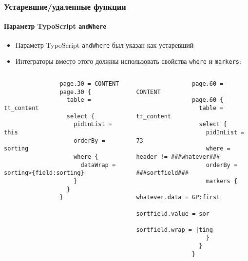 \begin{frame}[fragile]
	\frametitle{Устаревшие/удаленные функции}
	\framesubtitle{Параметр TypoScript \texttt{andWhere}}

	\lstset{basicstyle=\tiny\ttfamily}

	\begin{itemize}
		\item Параметр TypoScript \texttt{andWhere} был указан как устаревший
		\item Интеграторы вместо этого должны использовать свойства \texttt{where} и \texttt{markers}:
	\end{itemize}

	\begin{columns}[T]
		\begin{column}{.6\textwidth}

			\lstset{xleftmargin=1cm}

			\begin{lstlisting}
				page.30 = CONTENT
				page.30 {
				  table = tt_content
				  select {
				    pidInList = this
				    orderBy = sorting
				    where {
				      dataWrap = sorting>{field:sorting}
				    }
				  }
				}
			\end{lstlisting}
		\end{column}
		\begin{column}{.4\textwidth}
			\begin{lstlisting}
				page.60 = CONTENT
				page.60 {
				  table = tt_content
				  select {
				    pidInList = 73
				    where = header != ###whatever###
				    orderBy = ###sortfield###
				    markers {
				      whatever.data = GP:first
				      sortfield.value = sor
				      sortfield.wrap = |ting
				    }
				  }
				}
			\end{lstlisting}
		\end{column}
	\end{columns}

\end{frame}



